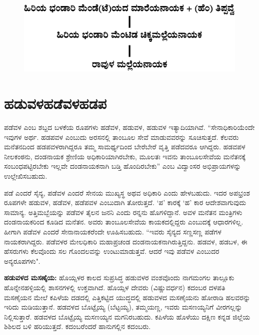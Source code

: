 \begin{figure}[H]
\includegraphics[scale=1.2]{images/chap3/chap3fig31.jpeg}
\end{figure}


\section{ಹಡುವಳ\enginline{-}ಹಡೆವಳ\enginline{-}ಹಡಪ}

ಪಡೆವಳ ಎಂಬ ಶಬ್ದದ ಬಳಕೆಯ ರೂಪಗಳು ಹಡೆವಳ, ಹಡುವಳ, ಹಡುವಳ ಇತ್ಯಾದಿಯಾಗಿವೆ. “ಸೇನಾಧಿಕಾರಿಯೆಂದೇ ಇವುಗಳ ಅರ್ಥ. ಹಡಪವಳ ಎಂಬುದು ಅರಸನಲ್ಲಿ ತಾಂಬೂಲ ಸೇವೆ ಮಾಡುವವರನ್ನು ಸೂಚಿಸುತ್ತದೆ. ಕೆಲವರು ಮನೆತನದಿಂದ ಹಡಪವಳರಾಗಿದ್ದರೂ ತಮ್ಮ ಸಾಮರ್ಥ್ಯದಿಂದ ಬೇರೆಬೇರೆ ವೃತ್ತಿ ಪಡೆದವರೂ ಆಗಿದ್ದರು. ಹಡವಪಳ ನೀಲಕಂಠನು, ದಂಡನಾಯಕ ಶ್ರೇಣಿಯ ಅಧಿಕಾರಿಯಾಗಿರಬೇಕು, ಮೂಲತಃ ಇವನು ತಾಂಬೂಲಸೇವೆಯ ಮನೆತನಕ್ಕೆ ಸಂಬಂಧಪಟ್ಟಿರಬೇಕು ಇಲ್ಲವೇ ದಂಡನಾಯಕನಾಗಿ ಬಡ್ತಿ ಹೊಂದಿರಬೇಕು” ಎಂಬ ವಿದ್ವಾಂಸರ ಅಭಿಪ್ರಾಯಗಳನ್ನು ಉಲ್ಲೇಖಿಸಬಹುದು.

ಪಡೆ ಎಂದರೆ ಸೈನ್ಯ, ಪಡೆವಳ ಎಂದರೆ ಸೇನಯ ಮುಖ್ಯಸ್ಥ ಅಥವ ಅಧಿಕಾರಿ ಎಂದು ಹೇಳಬಹುದು. ಇದರ ಅಪಭ್ರಂಶ ರೂಪಗಳೇ ಹಡುವಳ, ಹಡೆವಳ, ಹಡೆಪವಳ ಎಂಬುದಾಗಿ ತೋರುತ್ತದೆ. ‘ಪ’ ಕಾರಕ್ಕೆ ‘ಹ’ ಕಾರ ಆದೇಶವಾಗುವುದು ಸಾಮಾನ್ಯ. ಅತ್ತಿಮಬ್ಬೆಯನ್ನು ಪಡೆವಳ ತೈಲನ ಜನನಿ ಎಂದು ರನ್ನನು ಹೊಗಳಿದ್ದಾನೆ. ಅವಳ ಮನೆತನ ಮಂತ್ರಿಗಳು ದಂಡನಾಯಕರಿಂದ ಕೂಡಿದ ಮನೆತನ. ಅವರು ತಾಂಬೂಲಸೇವೆಯ ಕಾಯಕದಲ್ಲಿದ್ದರು ಎಂಬುದಕ್ಕೆ ಆಧಾರಗಳಿಲ್ಲ. ಹೀಗಾಗಿ ಪಡೆವಳ ಎಂದರೆ ಸೇನಾನಾಯಕರೆಂದೇ ಊಹಿಸಬಹುದು. “ಇವರು ಸೈನ್ಯದ ಸಣ್ಣಸಣ್ಣ ಪಡೆಗಳ ನಾಯಕರಾಗಿದ್ದರು. ಪಡೆವಳರ ಮೇಲಧಿಕಾರಿ ಮಹಾಪ್ರಚಂಡ ದಂಡನಾಯಕನಾಗಿರುತ್ತಿದ್ದನು. ಹಡವಳ, ಹಡಬಳ, ಈ ಹೆಸರುಗಳು ಕೆಲವೊಂದು ಸಲ ಗೊಂದಲವನ್ನು ಉಂಟುಮಾಡುತ್ತವೆ. ಆದರೆ ಇವು ಪಡೆವಳ ಎಂಬುದರ ಅನ್ಯರೂಪಗಳು".

\textbf{ಹಡುವಳದ ಮಸಣೈಯ:} ಹೊಯ್ಸಳರ ಕಾಲದ ಸುಪ್ರಸಿದ್ಧ ಹಡುವಳರ ವಂಶವೊಂದು ನಾಗಮಂಗಲ ತಾಲ್ಲೂಕು ಹೊನ್ನೇನಹಳ್ಳಿಯಲ್ಲಿ ಶಾಸನಗಳಲ್ಲಿ ಉಕ್ತವಾಗಿದೆ. ಹೊಯ್ಸಳ ದೇವರು (ವಿಷ್ಣುವರ್ಧನ) ಕದಂಬರ ದಳಪತಿ ಮಸಣೈಯನ ಮೇಲೆ ಕಪಿಳೆಯ ದಡದಲ್ಲಿ ಎತ್ತಿಕಟ್ಟಿದ ಯುದ್ಧದಲ್ಲಿ ಹಡುವಳದ ಮಸಣೈಯನು ಹೋರಾಡಿ ಹಲವರನ್ನು ಇರಿದು ಮಡಿಯುತ್ತಾನೆ. ಹಡವಳದ ಬೊಟ್ಟೈಯ್ಯ (ಬೆಟ್ಟಯ್ಯ), ತಮ್ಮಯಣ್ಣ, ಇವರು ಮಸಣಯ್ಯನಿಗೆ ವೀರಗಲ್ಲನ್ನು ನಿಲ್ಲಿಸುತ್ತಾರೆ. ಹಡವಳದ ಬೊಟ್ಟೈಯ್ಯ ಮಸಣಯ್ಯನ ಮಗನಿರಬಹುದು. ಕಪಿಳೆಯ ಹೊಳೆಯು ದಕ್ಷಿಣ ಕನ್ನಡ ಜಿಲ್ಲೆಯ ಶಿಶಿಲದ ಬಳಿ ಹರಿಯುತ್ತದೆ. ಕದಂಬರೆಂದರೆ ಹಾನುಗಲ್ಲಿನ ಕದಂಬರು.

